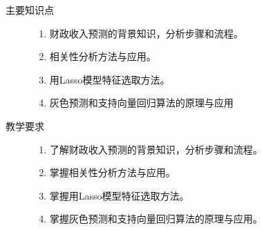 \documentclass[12pt,a4paper,openany,cap]{ctexbook}
\begin{document}
\begin{description}
\item[主要知识点]
  \begin{minipage}[t]{0.8\linewidth}
    \begin{enumerate}
    \item  财政收入预测的背景知识，分析步骤和流程。
\item\label{item:215}  相关性分析方法与应用。
\item\label{item:216}  用Lasso模型特征选取方法。
\item\label{item:217}  灰色预测和支持向量回归算法的原理与应用
    \end{enumerate}
  \end{minipage}

\item[教学要求]
  \begin{minipage}[t]{0.8\linewidth}
    \begin{enumerate}
    \item  了解财政收入预测的背景知识，分析步骤和流程。
\item\label{item:218}  掌握相关性分析方法与应用。
\item\label{item:219}  掌握用Lasso模型特征选取方法。
\item\label{item:220}  掌握灰色预测和支持向量回归算法的原理与应用。
    \end{enumerate}
  \end{minipage}


\end{description}
\end{document}
